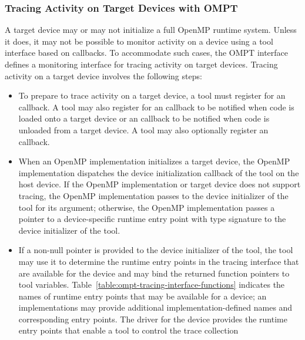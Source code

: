 \subsubsection{Tracing Activity on Target Devices with OMPT}
\label{sec:tracing-device-activity}

A target device may or may not initialize a full OpenMP runtime system.
Unless it does, it may not be possible to monitor activity on a device 
using a tool interface based on callbacks. To accommodate such cases, 
the OMPT interface defines a monitoring interface for tracing activity 
on target devices. Tracing activity on a target device involves the 
following steps:

\begin{itemize}
\item To prepare to trace activity on a target device, a tool must 
      register for an  callback.  
      A tool may also register for an  
      callback to be notified when code is loaded onto a target device 
      or an  callback to be notified 
      when code is unloaded from a target device. A tool may also 
      optionally register an  callback.
\item When an OpenMP implementation initializes a target device, the
      OpenMP implementation dispatches the device initialization callback 
      of the tool on the host device. If the OpenMP implementation or target 
      device does not support tracing, the OpenMP implementation passes
       to the device initializer of the tool for its  
      argument; otherwise, the OpenMP implementation passes a pointer 
      to a device-specific runtime entry point with type signature 
       to the device initializer of the tool.
\item If a non-null  pointer is provided to the device initializer 
      of the tool, the tool may use it to determine the runtime entry points in 
      the tracing interface that are available for the device and may bind the 
      returned function pointers to tool variables. 
      Table~\ref{table:ompt-tracing-interface-functions} indicates the
      names of runtime entry points that may be available for a device; an
      implementations may provide additional implementation-defined names and 
      corresponding entry points. The driver for the device provides the
      runtime entry points that enable a tool to control the trace collection

\end{itemize}
